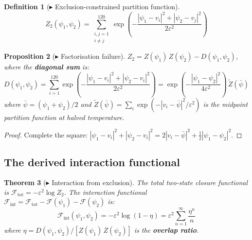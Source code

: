 \documentclass[12pt]{article}
\newtheorem{theorem}{Theorem}
\newtheorem{proposition}[theorem]{Proposition}
\newtheorem{definition}[theorem]{Definition}
\newcommand{\Fcal}{\mathcal{F}}
\newcommand{\Fint}{\Fcal_{\mathrm{int}}}
\newcommand{\Ftot}{\Fcal_{\mathrm{tot}}}
\begin{document}
\begin{definition}[$\blacktriangleright$ Exclusion-constrained partition function]\label{def:Z2}
\begin{equation}\label{eq:Z2}
    Z_2(\psi_1, \psi_2) = \sum_{\substack{i,j=1 \\ i \neq j}}^{120}
    \exp\!\left(-\frac{|\psi_1 - v_i|^2 + |\psi_2 - v_j|^2}{2\varepsilon^2}\right)
\end{equation}
\end{definition}

\begin{proposition}[$\blacktriangleright$ Factorisation failure]\label{prop:Z2}
$Z_2 = Z(\psi_1)\,Z(\psi_2) - D(\psi_1, \psi_2)$, where the
\textbf{diagonal sum} is:
\begin{equation}\label{eq:D}
    D(\psi_1, \psi_2) = \sum_{i=1}^{120}
    \exp\!\left(-\frac{|\psi_1 - v_i|^2 + |\psi_2 - v_i|^2}{2\varepsilon^2}\right)
    = \exp\!\left(-\frac{|\psi_1 - \psi_2|^2}{4\varepsilon^2}\right)\,
    \widetilde{Z}(\bar{\psi})
\end{equation}
where $\bar{\psi} = (\psi_1 + \psi_2)/2$ and
$\widetilde{Z}(\bar{\psi}) = \sum_i \exp(-|v_i - \bar{\psi}|^2/\varepsilon^2)$
is the midpoint partition function at halved temperature.
\end{proposition}

\begin{proof}
Complete the square:
$|\psi_1 - v_i|^2 + |\psi_2 - v_i|^2 = 2|v_i - \bar{\psi}|^2 + \tfrac{1}{2}|\psi_1 - \psi_2|^2$.
\end{proof}

\subsection{The derived interaction functional}

\begin{theorem}[$\blacktriangleright$ Interaction from exclusion]\label{thm:Fint}
The total two-state closure functional is $\Ftot = -\varepsilon^2\log Z_2$.
The interaction functional
$\Fint = \Ftot - \Fcal(\psi_1) - \Fcal(\psi_2)$ is:
\begin{equation}\label{eq:Fint}
    \Fint(\psi_1, \psi_2) = -\varepsilon^2\log(1 - \eta)
    = \varepsilon^2\sum_{n=1}^{\infty}\frac{\eta^n}{n}
\end{equation}
where $\eta = D(\psi_1,\psi_2)/[Z(\psi_1)\,Z(\psi_2)]$ is the
\textbf{overlap ratio}.
\end{theorem}
\end{document}
